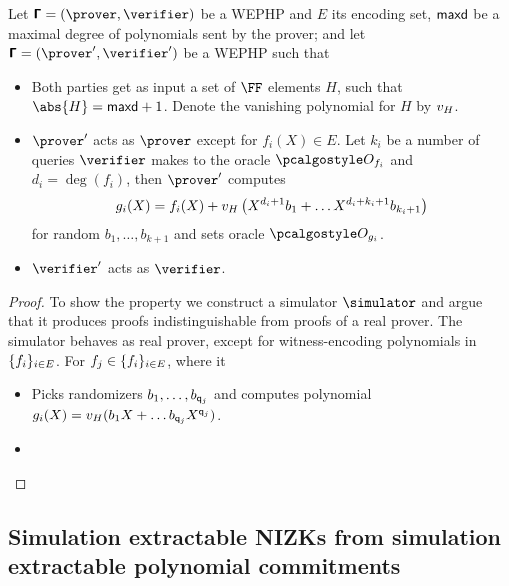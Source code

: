 \documentclass[runningheads,11pt]{llncs}
\begin{document}
\begin{theorem}
  Let $\PHP = (\prover, \verifier)$ be a WEPHP and $E$ its encoding set,
  $\mathsf{maxd}$ be a maximal degree of polynomials sent by the prover; and
  let $\PHP = (\prover', \verifier')$ be a WEPHP such that
  \begin{itemize}
  \item Both parties get as input a set of $\FF$ elements $H$, such that
    $\abs{H} = \maxdeg + 1$. Denote the vanishing polynomial for $H$ by $v_{H}$.
  \item $\prover'$ acts as $\prover$ except for $f_i(X) \in E$. Let $k_i$ be a
    number of queries $\verifier$ makes to the oracle $\oracleo_{f_i}$ and
    $d_i = \deg(f_i)$, then $\prover'$ computes
      \[
        g_i(X) = f_i(X) + v_{H}\left(X^{d_i + 1} b_1 + \ldots
        X^{d_i + k_i + 1} b_{k_i + 1}\right)
      \]
      for random $b_1, \ldots, b_{k + 1}$ and sets oracle $\oracleo_{g_i}$.
    \item $\verifier'$ acts as $\verifier$. 
  \end{itemize}
\end{theorem}
\begin{proof}


   To show the property we construct a simulator
  $\simulator$ and argue that it produces proofs indistinguishable from proofs
  of a real prover. The simulator behaves as real prover, except for
  witness-encoding polynomials in $\{f_i\}_{i \in E}$. For
  $f_j \in \{f_i\}_{i \in E}$, where it
  \begin{itemize}
  \item Picks randomizers $b_1, \ldots, b_{\mathsf{q}_j}$ and computes polynomial
    $g_i(X) =  v_{H}(b_1 X + \ldots b_{\mathsf{q}_j} X^{\mathsf{q}_j})$. 
  \item {}
  \end{itemize}
  
\end{proof}

\subsection{Simulation extractable NIZKs from simulation extractable polynomial
  commitments}
\end{document}
